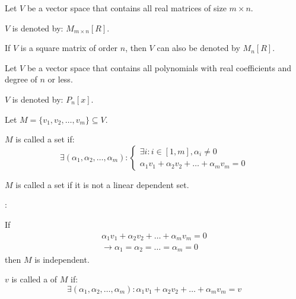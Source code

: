       \par Let $V$ be a vector space that contains all real matrices of size
      $m \times n$.
      \par $V$ is denoted by: $M_{m \times n}[R]$.
      \par If $V$ is a square matrix of order $n$, then $V$ can also be denoted
      by $M_{n}[R]$.

      \par Let $V$ be a vector space that contains all polynomials with real
      coefficients and degree of $n$ or less.
      \par $V$ is denoted by: $P_{n}[x]$.
  \hiiEND


  \par Let $M = \{v_{1}, v_{2}, \ldots, v_{m}\} \subseteq V$.


      \par $M$ is called a  set if:
      \[
        \exists (\alpha_{1}, \alpha_{2}, \ldots, \alpha_{m}):
        \begin{cases}
          \exists i: i \in [1, m], \alpha_{i} \neq 0 \\
          \alpha_{1} v_{1} + \alpha_{2} v_{2}
            + \ldots + \alpha_{m} v_{m} = 0
        \end{cases}
      \]

      \par $M$ is called a  set if it is
      not a linear dependent set.
      \par {}:
      \par If
      \begin{align*}
          \alpha_{1} v_{1} + \alpha_{2} v_{2}
            + \ldots + \alpha_{m} v_{m} = 0 \\
          \rightarrow \alpha_{1} = \alpha_{2}
            = \ldots = \alpha_{m} = 0 
      \end{align*}
      then $M$ is independent.

  \hiiEND

       \par $v$ is called a  of $M$ if:
      \[
        \exists (\alpha_{1}, \alpha_{2}, \ldots, \alpha_{m}):
          \alpha_{1} v_{1} + \alpha_{2} v_{2}
            + \ldots + \alpha_{m} v_{m} = v
      \]

